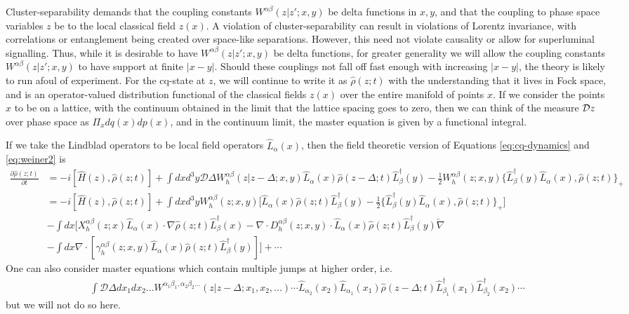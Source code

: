 \documentclass[aps,pra,showpacs,citeautoscript,amsmath,amssymb,floatfix,superscriptaddress,bbm, verbatim,amsfonts,changes,12pt,nofootinbib,longbibliography]{revtex4-2}
\def\z{{z}}
\def\L{{\hat{L}}}
\def\Hq{\hat{H}}
\def\dist{{\Delta}}
\def\ddf{{\mathcal D}\dist}
\def\rate{{W}}
\def\ab{^{\alpha\beta}}
\def\lax{{\L_\alpha(x)}}
\def\lbx{{\L^\dagger_\beta(x)}}
\def\lby{{\L^\dagger_\beta(y)}}
\def\rateabx{{\rate\ab(\z|\z';x,y)}}
\def\rateabxd{{\rate_h\ab(\z|\z-\dist;x,y)}}
\renewcommand{\varrho}{\hat{\rho}}
\def\psiz{{\varrho(\z;t)}}
\def\psizt{{\varrho(\z;t)}}
\def\psizd{{\varrho(\z-\dist;t)}}
\def\friction{\gamma}
\begin{document}
Cluster-separability\cite{cluster_foot} demands that 
the coupling constants $\rateabx$ be delta functions in $x,y$\cite{bps}, and that the coupling to phase space variables $\z$ be to the local classical field $\z(x)$. A violation of cluster-separability can result in violations of Lorentz invariance, with correlations or entanglement being created over space-like separations. However, this need not violate causality or allow for superluminal signalling\cite{OR-intrinsic}. Thus, while it is desirable to have $\rateabx$ be delta functions,  for greater generality we will allow the coupling constants $\rateabx$ to have support at finite $|x-y|$. Should these couplings not fall off fast enough with increasing $|x-y|$, the theory is likely to run afoul of experiment.
For the cq-state at $\z$, we will continue to write it as $\psizt$ with the understanding that it lives in Fock space, and is an operator-valued distribution functional of the classical fields $\z(x)$ over the entire manifold of points $x$. If we consider the points $x$ to be on a lattice, with the continuum obtained in the limit that the lattice spacing goes to zero, then we can think of the measure ${\cal D}\z$ over phase space as $\Pi_xdq(x)dp(x)$, and in the continuum limit, the master equation is given by a functional integral. 




If we take the Lindblad operators to be local field operators $\lax$, then the field theoretic version of Equations \eqref{eq:cq-dynamics} and \eqref{eq:weiner2} is 
\begin{align}
  \frac{\partial\psiz}{\partial t}
  &=-i[\Hq(\z),\psiz]
 + \int dxd^3y\ddf
\rateabxd
\L_{\alpha}(x)\psizd\L_{\beta}^\dagger(y)
  -
\frac{1}{2}\rate_h\ab(\z;x,y)\{\lby\lax,\psiz\}_+   
\\
  &=-i[\Hq(\z),\psiz]
 + 
 \int dx d^3y
\rate_h\ab(\z;x,y)\Big[ \lax\psiz\lby
  -\frac{1}{2}
\{\L_{\beta}^\dagger(y)\L_{\alpha}(x),\psiz\}_+   
\Big]
\nonumber\\
&
-
\int dx  
\Big[  X^{\alpha\beta}_h(\z;x)
\lax\cdot\nabla \psiz\lbx
- \nabla\cdot D_h^{\alpha\beta}(\z;x,y)\cdot
\L_{\alpha}(x)
\psiz
\L_{\beta}^\dagger(y)
\overleftarrow{\nabla}\nonumber\\
&
-\int dx\nabla\cdot[
\friction^{\alpha\beta}_h(\z;x,y)
\lax\psiz\lby]
  \Big] +\cdots  
\label{eq:weinerfields}
\end{align}
One can also consider master equations which contain multiple jumps at higher order, i.e.
	\begin{align}
		\int \ddf dx_1 dx_2... \rate^{\alpha_1\beta_1,\alpha_2\beta_2...}(\z|\z-\dist;x_1,x_2,...)\cdots\L_{\alpha_2}(x_2)\L_{\alpha_1}(x_1)\psizd\L^\dagger_{\beta_1}(x_1)\L^\dagger_{\beta_2}(x_2)\cdots
		\nonumber
	\end{align}  but we will not do so here.
\end{document}
